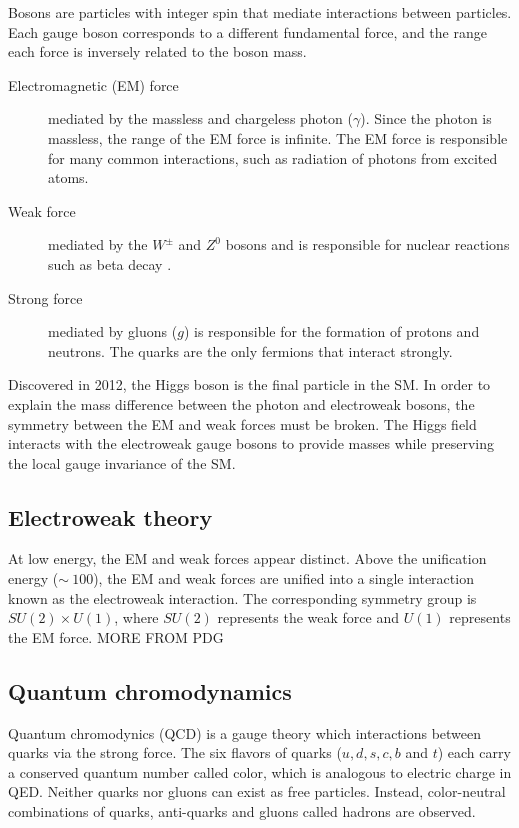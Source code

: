 Bosons are particles with integer spin that mediate interactions between particles. Each gauge boson corresponds to a different fundamental force, and the range each force is inversely related to the boson mass.
\begin{description}
\item[Electromagnetic (EM) force] mediated by the massless and chargeless photon ($\gamma$). Since the photon is massless, the range of the EM force is infinite. The EM force is responsible for many common interactions, such as radiation of photons from excited atoms.
\item[Weak force] mediated by the $W^{\pm}$ and $Z^{0}$ bosons and is responsible for nuclear reactions such as beta decay .
\item[Strong force] mediated by gluons ($g$) is responsible for the formation of protons and neutrons. The quarks are the only fermions that interact strongly. 
\end{description}

Discovered in 2012, the Higgs boson is the final particle in the SM. In order to explain the mass difference between the photon and electroweak bosons, the symmetry between the EM and weak forces must be broken. The Higgs field interacts with the electroweak gauge bosons to provide masses while preserving the local gauge invariance of the SM.

\subsection{Electroweak theory}
At low energy, the EM and weak forces appear distinct. Above the unification energy ($\sim\ 100 $\gev), the EM and weak forces are unified into a single interaction known as the electroweak interaction. The corresponding symmetry group is $SU(2)\times U(1)$, where $SU(2)$ represents the weak force and $U(1)$ represents the EM force. 
MORE FROM PDG

\subsection{Quantum chromodynamics}
Quantum chromodynics (QCD) is a gauge theory which interactions between quarks via the strong force. The six flavors of quarks ($u,d,s,c,b$ and $t$) each carry a conserved quantum number called color, which is analogous to electric charge in QED. Neither quarks nor gluons can exist as free particles. Instead, color-neutral combinations of quarks, anti-quarks and gluons called hadrons are observed.

